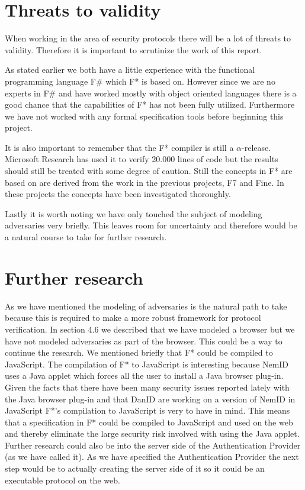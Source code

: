 \documentclass[twosided]{report}
\begin{document}
\section{Threats to validity}
When working in the area of security protocols there will be a lot of threats to validity. Therefore it is important to scrutinize the work of this report.
\par
As stated earlier we both have a little experience with the functional programming language F\# which F* is based on. However since we are no experts in F\# and have worked mostly with object oriented languages there is a good chance that the capabilities of F* has not been fully utilized. Furthermore we have not worked with any formal specification tools before beginning this project.
\par
It is also important to remember that the F* compiler is still a $\alpha$-release. Microsoft Research has used it to verify 20.000 lines of code \cite{fstar-msr} but the results should still be treated with some degree of caution. Still the concepts in F* are based on are derived from the work in the previous projects, F7 and Fine. In these projects the concepts have been investigated thoroughly.
\par
Lastly it is worth noting we have only touched the subject of modeling adversaries very briefly. This leaves room for uncertainty and therefore would be a natural course to take for further research.
\section{Further research}
As we have mentioned the modeling of adversaries is the natural path to take because this is required to make a more robust framework for protocol verification. In section 4.6 we described that we have modeled a browser but we have not modeled adversaries as part of the browser. This could be a way to continue the research. We mentioned briefly that F* could be compiled to JavaScript. The compilation of F* to JavaScript is interesting because NemID uses a Java applet which forces all the user to install a Java browser plug-in. Given the facts that there have been many security issues reported lately with the Java browser plug-in and that DanID are working on a version of NemID in JavaScript F*'s compilation to JavaScript is very to have in mind. This means that a specification in F* could be compiled to JavaScript and used on the web and thereby eliminate the large security risk involved with using the Java applet. Further research could also be into the server side of the Authentication Provider (as we have called it). As we have specified the Authentication Provider the next step would be to actually creating the server side of it so it could be an executable protocol on the web.
\end{document}
